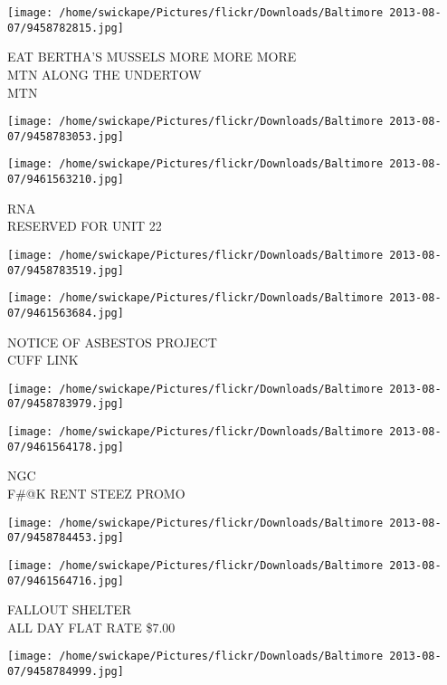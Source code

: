 \documentclass[10pt,letterpaper]{article}
\begin{document}
\texttt{[image: /home/swickape/Pictures/flickr/Downloads/Baltimore 2013-08-07/9458782815.jpg]}

EAT BERTHA'S MUSSELS MORE MORE MORE\\
MTN ALONG THE UNDERTOW\\
MTN\\
\pagebreak

\texttt{[image: /home/swickape/Pictures/flickr/Downloads/Baltimore 2013-08-07/9458783053.jpg]}

\vspace{0.25in}
\texttt{[image: /home/swickape/Pictures/flickr/Downloads/Baltimore 2013-08-07/9461563210.jpg]}

RNA\\
RESERVED FOR UNIT 22\\
\pagebreak

\texttt{[image: /home/swickape/Pictures/flickr/Downloads/Baltimore 2013-08-07/9458783519.jpg]}

\vspace{0.25in}
\texttt{[image: /home/swickape/Pictures/flickr/Downloads/Baltimore 2013-08-07/9461563684.jpg]}

NOTICE OF ASBESTOS PROJECT\\
CUFF LINK\\
\pagebreak

\texttt{[image: /home/swickape/Pictures/flickr/Downloads/Baltimore 2013-08-07/9458783979.jpg]}

\vspace{0.25in}
\texttt{[image: /home/swickape/Pictures/flickr/Downloads/Baltimore 2013-08-07/9461564178.jpg]}

NGC\\
F\#@K RENT STEEZ PROMO\\
\pagebreak

\texttt{[image: /home/swickape/Pictures/flickr/Downloads/Baltimore 2013-08-07/9458784453.jpg]}

\vspace{0.25in}
\texttt{[image: /home/swickape/Pictures/flickr/Downloads/Baltimore 2013-08-07/9461564716.jpg]}

FALLOUT SHELTER\\
ALL DAY FLAT RATE \$7.00\\
\pagebreak

\texttt{[image: /home/swickape/Pictures/flickr/Downloads/Baltimore 2013-08-07/9458784999.jpg]}
\end{document}
